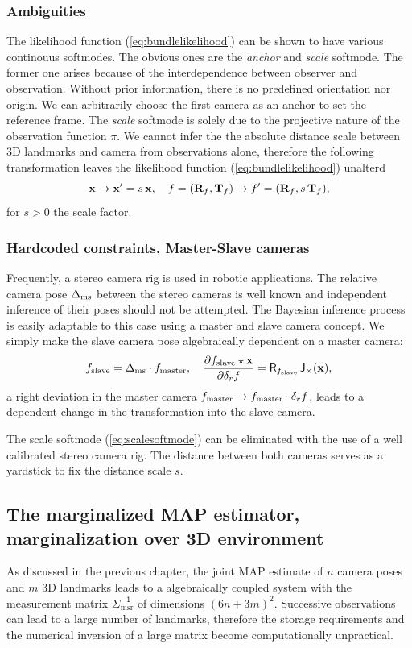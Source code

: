 \documentclass[conference]{IEEEtran}
\newcommand{\meas}{\mathsf{\Sigma^{-1}_\mathrm{msr}}}
\newcommand{\beq}{\begin{equation}}
\newcommand{\eeq}{\end{equation}}
\begin{document}
\subsubsection{Ambiguities}
The likelihood function (\ref{eq:bundlelikelihood}) can be shown to have various continouus softmodes.
The obvious ones are the {\em anchor} and {\em scale} softmode. The former one arises because of the
interdependence between observer and observation. Without prior information, there is no predefined orientation
nor origin. We can arbitrarily choose the first camera as an anchor to set the reference frame. 
The {\em scale} softmode is solely due to the projective nature of the observation function $\pi$.
We cannot infer the the absolute distance scale between 3D landmarks and camera from observations alone,
therefore the following transformation leaves the likelihood function (\ref{eq:bundlelikelihood}) unalterd
\beq
    {\bf x}\rightarrow {\bf x}' = s \, {\bf x}, \quad
    f=({\bf R}_f,{\bf T}_f) \rightarrow f'=({\bf R}_f, s\, {\bf T}_f),
    \label{eq:scalesoftmode}
\eeq
for $s>0$ the scale factor.
\subsubsection{Hardcoded constraints, Master-Slave cameras}
Frequently, a stereo camera rig is used in robotic applications. 
The relative camera pose $\Delta_{\rm ms}$ between the stereo cameras
is well known and independent inference of their poses should not be attempted. The Bayesian inference
process is easily adaptable to this case using a master and slave camera concept.
We simply make the slave camera pose algebraically dependent on a master camera:
\beq
    f_{\rm slave} =\Delta_{\rm ms} \cdot f_{\rm master}, \quad
    {\partial f_{\rm slave}\star {\bf x} \over \partial \delta_r f} = {\sf R}_{f_{\rm slave}} \,
    {\sf J_\times}({\bf x}),
\eeq
a right deviation in the master camera $f_{\rm master}\rightarrow f_{\rm master}\cdot\delta_rf$,
leads to a dependent change in the transformation into the slave camera.

The scale softmode (\ref{eq:scalesoftmode}) can be eliminated with the use of a well
calibrated stereo camera rig. The distance between both cameras serves as a yardstick to
fix the distance scale $s$.

\subsection{The marginalized MAP estimator, marginalization over 3D environment}
As discussed in the previous chapter, the joint MAP estimate of $n$ camera poses and $m$ 3D
landmarks leads to a algebraically coupled system with the measurement matrix $\meas$
of dimensions $(6n+3m)^2$. Successive observations can lead to a large number of landmarks,
therefore the storage requirements and the numerical inversion of a large matrix
become computationally unpractical. 
\end{document}

